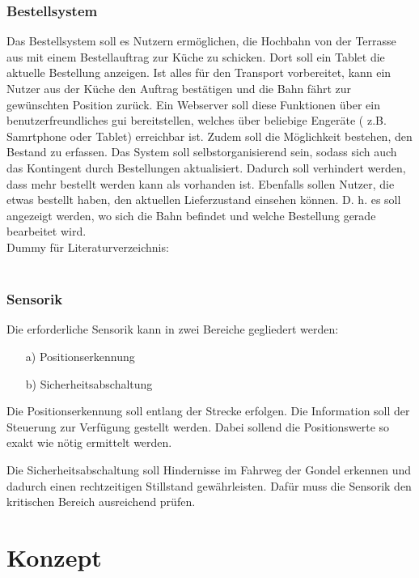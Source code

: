 \subsection{Bestellsystem}


Das Bestellsystem soll es Nutzern ermöglichen, die Hochbahn von der Terrasse aus mit einem Bestellauftrag zur Küche zu schicken. 
Dort soll ein Tablet die aktuelle Bestellung anzeigen. Ist alles für den Transport vorbereitet, kann ein Nutzer aus der Küche den Auftrag 
bestätigen und die Bahn fährt zur gewünschten Position zurück. Ein Webserver soll diese Funktionen über ein benutzerfreundliches \acrfull{gui} bereitstellen, welches über beliebige Engeräte ( z.B. Samrtphone oder Tablet) erreichbar ist.
Zudem soll die Möglichkeit bestehen, den Bestand zu erfassen. Das System soll selbstorganisierend sein, sodass sich auch das Kontingent durch Bestellungen aktualisiert. Dadurch soll verhindert werden, dass mehr bestellt werden kann als vorhanden ist.
Ebenfalls sollen Nutzer, die etwas bestellt haben, den aktuellen Lieferzustand einsehen können. D. h. es soll angezeigt werden, wo sich die Bahn befindet und welche Bestellung gerade bearbeitet wird.
\\Dummy für Literaturverzeichnis:\\
\cite{knuth84}\\


\subsection{Sensorik}
Die erforderliche Sensorik kann in zwei Bereiche gegliedert werden: 

\begin{itemize}
	\item [a)] Positionserkennung 
	\item [b)] Sicherheitsabschaltung 
	
\end{itemize}

Die Positionserkennung soll entlang der Strecke erfolgen. Die Information soll der Steuerung zur Verfügung gestellt werden. Dabei sollend die Positionswerte so exakt wie nötig ermittelt werden.

Die Sicherheitsabschaltung soll Hindernisse im Fahrweg der Gondel erkennen und dadurch einen rechtzeitigen Stillstand gewährleisten. Dafür muss die Sensorik den kritischen Bereich ausreichend prüfen. 





\chapter{Konzept}
